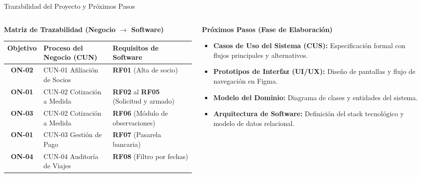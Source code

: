 \documentclass[aspectratio=169, 10pt]{beamer}
\begin{document}
\begin{frame}{Trazabilidad del Proyecto y Próximos Pasos}
    \begin{columns}[t]
        \begin{column}{0.50\textwidth}
            \begin{block}{\textbf{Matriz de Trazabilidad (Negocio $\rightarrow$ Software)}}
                \scriptsize
                \renewcommand{\arraystretch}{1.2}
                \begin{tabularx}{\textwidth}{cLL}
                \hline
                \textbf{Objetivo} & \textbf{Proceso del Negocio (CUN)} & \textbf{Requisitos de Software} \\ \hline
                \textbf{ON-02} & CUN-01 Afiliación de Socios & \textbf{RF01} (Alta de socio) \\ \hline
                \textbf{ON-01} & CUN-02 Cotización a Medida & \textbf{RF02} al \textbf{RF05} (Solicitud y armado) \\ \hline
                \textbf{ON-03} & CUN-02 Cotización a Medida & \textbf{RF06} (Módulo de observaciones) \\ \hline
                \textbf{ON-01} & CUN-03 Gestión de Pago & \textbf{RF07} (Pasarela bancaria) \\ \hline
                \textbf{ON-04} & CUN-04 Auditoría de Viajes & \textbf{RF08} (Filtro por fechas) \\ \hline
                \end{tabularx}
            \end{block}
        \end{column}
        
        \begin{column}{0.47\textwidth}
            \begin{exampleblock}{\textbf{Próximos Pasos (Fase de Elaboración)}}
                \small
                \begin{itemize}
                    \item \textbf{Casos de Uso del Sistema (CUS):} Especificación formal con flujos principales y alternativos.
                    \item \textbf{Prototipos de Interfaz (UI/UX):} Diseño de pantallas y flujo de navegación en Figma.
                    \item \textbf{Modelo del Dominio:} Diagrama de clases y entidades del sistema.
                    \item \textbf{Arquitectura de Software:} Definición del stack tecnológico y modelo de datos relacional.
                \end{itemize}
            \end{exampleblock}
        \end{column}
    \end{columns}
\end{frame}
\end{document}
